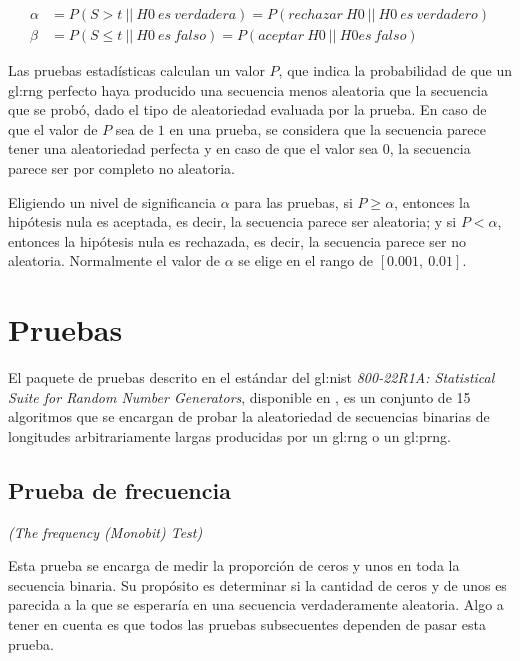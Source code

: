 \begin{align}
  \alpha &= P(S > t\: ||\: H0\: es\: verdadera)
          = P(rechazar\: H0\: ||\: H0\: es\: verdadero)\\
  \beta  &= P(S \leq t\: ||\: H0\: es\: falso)
          = P(aceptar\: H0\: ||\: H0 es\: falso)
\end{align}

Las pruebas estadísticas calculan un valor $P$, que indica la probabilidad de
que un \gls{gl:rng} perfecto haya producido una secuencia menos aleatoria que
la secuencia que se probó, dado el tipo de aleatoriedad evaluada por la prueba.
En caso de que el valor de $P$ sea de $1$ en una prueba, se considera que la
secuencia parece tener una aleatoriedad perfecta y en caso de que el valor
sea $0$, la secuencia parece ser por completo no aleatoria.

Eligiendo un nivel de significancia $\alpha$ para las pruebas, si $P \geq
\alpha$, entonces la hipótesis nula es aceptada, es decir, la secuencia
parece ser aleatoria; y si $P < \alpha$, entonces la hipótesis nula es
rechazada, es decir, la secuencia parece ser no aleatoria. Normalmente
el valor de $\alpha$ se elige en el rango de $[0.001,\: 0.01]$.

\section{Pruebas} %
\label{sec:lista_pruebas}

El paquete de pruebas descrito en el estándar del \gls{gl:nist}
\textit{800-22R1A: Statistical Suite for Random Number Generators}, disponible
en \cite{nist_pruebas}, es un conjunto de 15 algoritmos que se encargan de
probar la aleatoriedad de secuencias binarias de longitudes arbitrariamente
largas producidas por un \gls{gl:rng} o un \gls{gl:prng}.

\subsection{Prueba de frecuencia} %
\textit{(The frequency (Monobit) Test)}

Esta prueba se encarga de medir la proporción de ceros y unos en toda la
secuencia binaria. Su propósito es determinar si la cantidad de ceros y de
unos es parecida a la que se esperaría en una secuencia verdaderamente
aleatoria. Algo a tener en cuenta es que todos las pruebas subsecuentes
dependen de pasar esta prueba.

